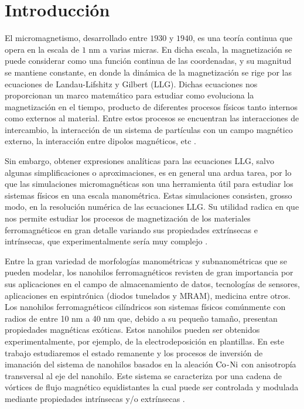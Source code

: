 \newpage
\section{Introducción}

El micromagnetismo, desarrollado entre $1930$ y $1940$, es una teoría continua que opera en la escala de $1$ nm a varias micras. En dicha escala, la magnetización se puede considerar como una función continua de las coordenadas, y su magnitud se mantiene constante, en donde la dinámica de la magnetización se rige por las  ecuaciones de Landau-Lifshitz y Gilbert (LLG). Dichas ecuaciones nos proporcionan un marco matemático para estudiar como evoluciona la magnetización en el tiempo, producto de diferentes procesos físicos tanto internos como externos al material. Entre estos procesos se encuentran las interacciones de intercambio, la interacción de un sistema de partículas con un campo magnético externo, la interacción entre dipolos magnéticos, etc \cite{KronmüllerMicromagnetism,Exl2020}. 
 

\vspace{10pt}

Sin embargo, obtener expresiones analíticas para las ecuaciones LLG, salvo algunas simplificaciones o aproximaciones, es en general una ardua tarea, por lo que las simulaciones micromagnéticas son una herramienta útil para estudiar los sistemas físicos en una escala manométrica. Estas simulaciones consisten, grosso modo, en la resolución numérica de las ecuaciones LLG.  Su utilidad radica en que nos permite estudiar los  procesos de magnetización de los materiales ferromagnéticos en gran detalle variando sus propiedades extrínsecas e intrínsecas, que experimentalmente sería muy complejo \cite{Tomorrow}. 

\vspace{10pt}

Entre la gran variedad de morfologías manométricas y subnanométricas que se pueden modelar, los nanohilos ferromagnéticos revisten de gran importancia por sus aplicaciones en el campo de almacenamiento de datos, tecnologías de sensores, aplicaciones en espintrónica (diodos tunelados y MRAM), medicina entre otros. Los nanohilos ferromagnéticos cilíndricos son sistemas físicos comúnmente con radios de entre 10 nm a 40 nm que, debido a su pequeño tamaño, presentan propiedades magnéticas exóticas. Estos nanohilos pueden ser obtenidos experimentalmente, por ejemplo, de la electrodeposición en plantillas. En este trabajo estudiaremos el estado remanente y los procesos de inversión de imanación del sistema de nanohilos basados en la aleación $\ce{Co}$-$\ce{Ni}$ con anisotropía transversal al eje del nanohilo. Este sistema se caracteriza por una cadena de vórtices de flujo magnético equidistantes la cual puede ser controlada y modulada mediante propiedades intrínsecas y/o extrínsecas \cite{ExoticMagneticConfiguration}.

